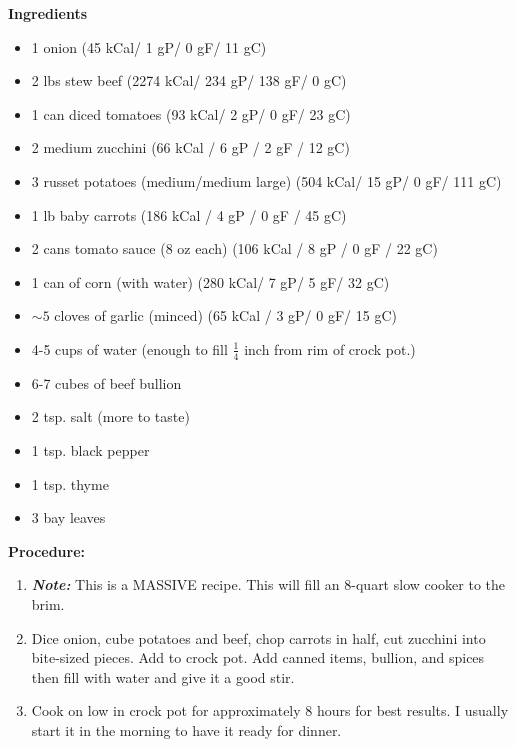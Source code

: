 \begin{multicols}{2}
\textbf{Ingredients}
\begin{itemize}
\item 1 onion \quad (45 kCal/ 1 gP/ 0 gF/ 11 gC)
\item 2 lbs stew beef \newline(2274 kCal/ 234 gP/  138 gF/ 0 gC)
\item 1 can diced tomatoes \quad (93 kCal/ 2 gP/ 0 gF/ 23 gC)
\item 2 medium zucchini \quad (66 kCal / 6 gP / 2 gF / 12 gC)
\item 3 russet potatoes (medium/medium large) \quad (504 kCal/ 15 gP/ 0 gF/ 111 gC)
\item 1 lb baby carrots \quad (186 kCal / 4 gP / 0 gF / 45 gC)
\item 2 cans tomato sauce (8 oz each) \quad (106 kCal / 8 gP / 0 gF / 22 gC)
\item 1 can of corn (with water) \quad (280 kCal/ 7 gP/ 5 gF/ 32 gC)
\item $\sim 5$ cloves of garlic (minced) (65 kCal / 3 gP/ 0 gF/ 15 gC) 
\item 4-5 cups of water (enough to fill $\frac{1}{4}$ inch from rim of crock pot.)

\item 6-7 cubes of beef bullion 
\item 2 tsp. salt (more to taste) 
\item 1 tsp. black pepper
\item 1 tsp. thyme
\item 3 bay leaves 


\end{itemize}


\columnbreak
\textbf{Procedure:}
\medskip


\begin{enumerate}
\item \textbf{\textit{Note:}} This is a MASSIVE recipe. This will fill an 8-quart slow cooker to the brim. 
\item Dice onion, cube potatoes and beef, chop carrots in half, cut zucchini into bite-sized pieces. Add to crock pot. Add canned items, bullion, and spices then fill with water and give it a good stir. 


\medskip
\item Cook on low in crock pot for approximately 8 hours for best results. I usually start it in the morning to have it ready for dinner. 
  

\end{enumerate}
\end{multicols}
